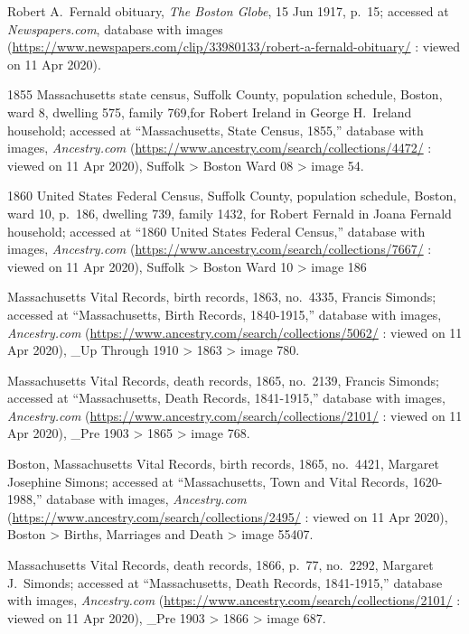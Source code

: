 \begin{thebibliography}{999}
Robert A.\ Fernald obituary, \textit{The Boston Globe}, 15 Jun 1917, p.\ 15; accessed at \textit{Newspapers.com}, database with images (\url{https://www.newspapers.com/clip/33980133/robert-a-fernald-obituary/} : viewed on 11 Apr 2020).

1855 Massachusetts state census, Suffolk County, population schedule, Boston, ward 8, dwelling 575, family 769,for Robert Ireland in George H.\ Ireland household; accessed at ``Massachusetts, State Census, 1855,'' database with images, \textit{Ancestry.com} (\url{https://www.ancestry.com/search/collections/4472/} : viewed on 11 Apr 2020), Suffolk > Boston Ward 08 > image 54.

1860 United States Federal Census, Suffolk County, population schedule, Boston, ward 10, p.\ 186, dwelling 739, family 1432, for Robert Fernald in Joana Fernald household; accessed at ``1860 United States Federal Census,'' database with images, \textit{Ancestry.com} (\url{https://www.ancestry.com/search/collections/7667/} : viewed on 11 Apr 2020), Suffolk > Boston Ward 10 > image 186

Massachusetts Vital Records, birth records, 1863, no.\ 4335, Francis Simonds; accessed at ``Massachusetts, Birth Records, 1840-1915,'' database with images, \textit{Ancestry.com} (\url{https://www.ancestry.com/search/collections/5062/} : viewed on 11 Apr 2020), \_Up Through 1910 > 1863 > image 780.

Massachusetts Vital Records, death records, 1865, no.\ 2139, Francis Simonds; accessed at ``Massachusetts, Death Records, 1841-1915,'' database with images, \textit{Ancestry.com} (\url{https://www.ancestry.com/search/collections/2101/} : viewed on 11 Apr 2020), \_Pre 1903 > 1865 > image 768.

Boston, Massachusetts Vital Records, birth records, 1865, no.\ 4421, Margaret Josephine Simons; accessed at ``Massachusetts, Town and Vital Records, 1620-1988,'' database with images, \textit{Ancestry.com} (\url{https://www.ancestry.com/search/collections/2495/} : viewed on 11 Apr 2020), Boston > Births, Marriages and Death > image 55407.

Massachusetts Vital Records, death records, 1866, p.\ 77, no.\ 2292, Margaret J.\ Simonds; accessed at ``Massachusetts, Death Records, 1841-1915,'' database with images, \textit{Ancestry.com} (\url{https://www.ancestry.com/search/collections/2101/} : viewed on 11 Apr 2020), \_Pre 1903 > 1866 > image 687.


\end{thebibliography}
